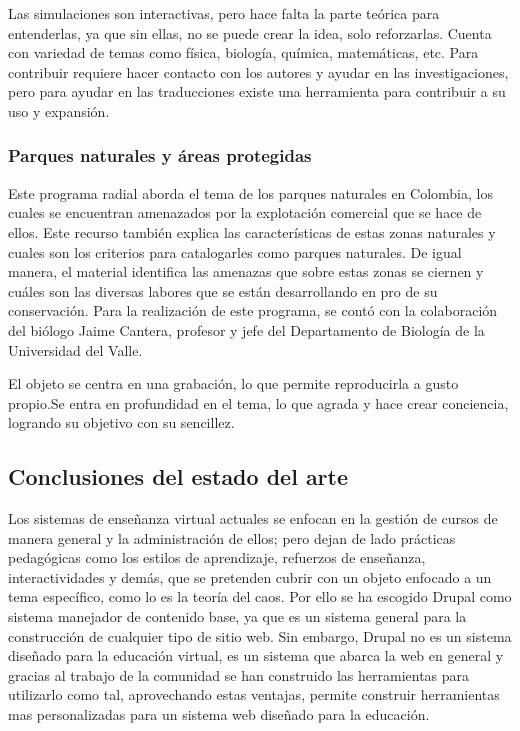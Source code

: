 \documentclass[letterpaper, 11pt, oneside]{article}
\theoremstyle{definition}
\theoremstyle{remark}
\begin{document}
Las simulaciones son interactivas, pero hace falta la parte teórica para entenderlas, ya que sin ellas, no se puede crear la idea, solo reforzarlas. Cuenta con variedad de temas como física, biología, química, matemáticas, etc. Para contribuir requiere hacer contacto con los autores y ayudar en las investigaciones, pero para ayudar en las traducciones existe una herramienta para contribuir a su uso y expansión.

\subsubsection{Parques naturales y áreas protegidas}

Este programa radial aborda el tema de los parques naturales en Colombia, los cuales se encuentran amenazados por la explotación comercial que se hace de ellos. Este recurso también explica las características de estas zonas naturales y cuales son los criterios para catalogarles como parques naturales. De igual manera, el material identifica las amenazas que sobre estas zonas se ciernen y cuáles son las diversas labores que se están desarrollando en pro de su conservación. Para la realización de este programa, se contó con la colaboración del biólogo Jaime Cantera, profesor y jefe del Departamento de Biología de la Universidad del Valle.\cite{parques}

El objeto se centra en una grabación, lo que permite reproducirla a gusto propio.Se entra en profundidad en el tema, lo que agrada y hace crear conciencia, logrando su objetivo  con su sencillez.

\subsection{Conclusiones del estado del arte}

Los sistemas de enseñanza virtual actuales se enfocan en la gestión de cursos de manera general y la administración de ellos; pero dejan de lado prácticas pedagógicas como los estilos de aprendizaje, refuerzos de enseñanza, interactividades y demás, que se pretenden cubrir con un objeto enfocado a un tema específico, como lo es la teoría del caos. Por ello se ha escogido Drupal como sistema manejador de contenido base, ya que es un sistema general para la construcción de cualquier tipo de sitio web. Sin embargo, Drupal no es un sistema diseñado para la educación virtual, es un sistema que abarca la web en general y gracias al trabajo de la comunidad se han construido las herramientas para utilizarlo como tal, aprovechando estas ventajas, permite construir herramientas mas personalizadas para un sistema web diseñado para la educación.
\end{document}
